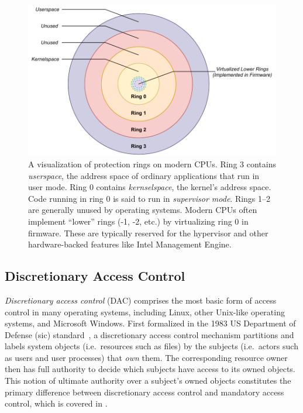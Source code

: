 \begin{figure}[htbp]
  \centering
  \includegraphics[width=0.8\linewidth]{figs/background/rings.pdf}
  \caption[Protection rings on modern CPUs]{
    A visualization of protection rings on modern CPUs. Ring 3 contains
    \textit{userspace}, the address space of ordinary applications that run in user mode.
    Ring 0 contains \textit{kernselspace}, the kernel's address space. Code running in
    ring 0 is said to run in \textit{supervisor mode}. Rings 1--2 are generally unused by
     operating systems.  Modern CPUs often implement \enquote{lower}
    rings (-1, -2, etc.) by virtualizing ring 0 in firmware. These are typically reserved
    for the hypervisor and other hardware-backed features like Intel Management Engine.
  }%
  \label{fig:rings}
\end{figure}

\subsection{Discretionary Access Control}%
\label{ss:dac}

\textit{Discretionary access control} (DAC) comprises the most basic form of access
control in many operating systems, including Linux, other Unix-like operating systems, and
Microsoft Windows. First formalized in the 1983 US Department of Defense (sic)
standard~\cite{orange_book}, a discretionary access control mechanism partitions and
labels system objects (i.e.~resources such as files) by the subjects (i.e.~actors such as
users and user processes) that \textit{own} them. The corresponding resource owner then
has full authority to decide which subjects have access to its owned objects. This notion
of ultimate authority over a subject's owned objects constitutes the primary difference
between discretionary access control and mandatory access control, which is covered in
.


